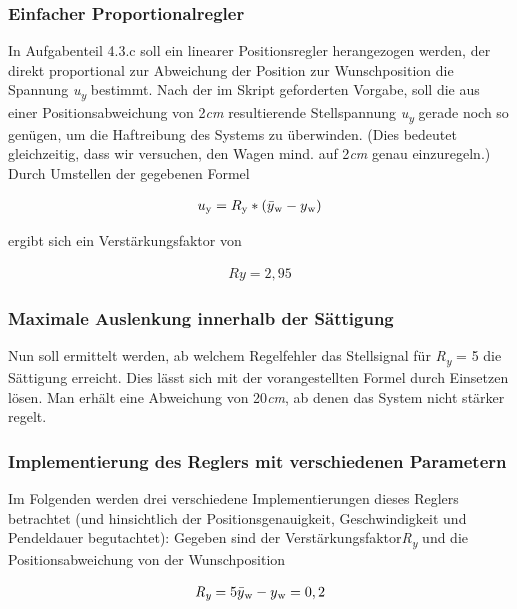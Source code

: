 \documentclass[10pt]{scrartcl}
\begin{document}
\subsubsection {Einfacher Proportionalregler}
In Aufgabenteil 4.3.c soll ein linearer Positionsregler herangezogen werden, der direkt proportional zur Abweichung der Position zur Wunschposition die Spannung \textit{ u\textsubscript{y}} bestimmt.
Nach der im Skript geforderten Vorgabe, soll die aus einer Positionsabweichung von 2\textit{cm} resultierende Stellspannung \textit{ u\textsubscript{y}} gerade noch so genügen, um die Haftreibung des Systems zu überwinden. (Dies bedeutet gleichzeitig, dass wir versuchen, den Wagen mind. auf 2\textit{cm} genau einzuregeln.) 
Durch Umstellen der gegebenen Formel 

\begin {align}
u\textsubscript{y}=R\textsubscript{y}*(\bar{y}\textsubscript{w}-y\textsubscript{w}) 
\end{align}

ergibt sich ein Verstärkungsfaktor von 

\begin {align}
Ry=2,95
\end{align}


\subsubsection {Maximale Auslenkung innerhalb der Sättigung}

Nun soll ermittelt werden, ab welchem Regelfehler das Stellsignal für 
\textit{R\textsubscript{y}} = 5 die Sättigung erreicht. 
Dies lässt sich mit der vorangestellten Formel durch Einsetzen lösen. 
Man erhält eine Abweichung von 20\textit{cm}, ab denen das System nicht stärker regelt.


\subsubsection {Implementierung des Reglers mit verschiedenen Parametern}

Im Folgenden werden drei verschiedene Implementierungen dieses Reglers betrachtet (und hinsichtlich der Positionsgenauigkeit, Geschwindigkeit und Pendeldauer begutachtet):\newline
Gegeben sind der Verstärkungsfaktor\textit{R\textsubscript{y}} und die Positionsabweichung von der Wunschposition

\begin{align}
\textit{R\textsubscript{y}} = 5 \bar{y}\textsubscript{w}-y\textsubscript{w} = 0,2 
\end{align}
\end{document}
